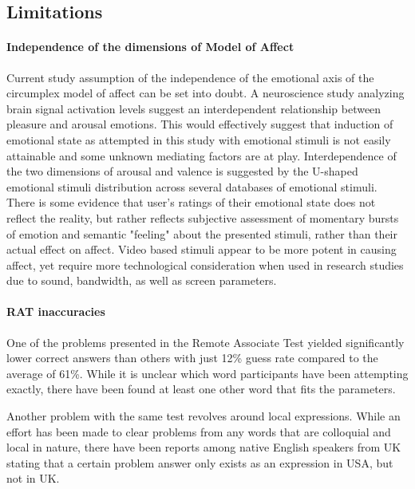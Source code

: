 	\subsection{Limitations}
	
	\paragraph{Independence of the dimensions of Model of Affect}
	
	Current study assumption of the independence of the emotional axis of the circumplex model of affect can be set into doubt. A neuroscience study \cite{Bestelmeyer2017} analyzing brain signal activation levels suggest an interdependent relationship between pleasure and arousal emotions. 
	This would effectively suggest that induction of emotional state as attempted in this study with emotional stimuli is not easily attainable and some unknown mediating factors are at play. Interdependence of the two dimensions of arousal and valence is suggested by the U-shaped emotional stimuli distribution across several databases of emotional stimuli. There is some evidence that user's ratings of their emotional state does not reflect the reality, but rather reflects subjective assessment of momentary bursts of emotion and semantic "feeling" about the presented stimuli, rather than their actual effect on affect. Video based stimuli appear to be more potent in causing affect, yet require more technological consideration when used in research studies due to sound, bandwidth, as well as screen parameters.
	
	\paragraph{RAT inaccuracies}
	
	One of the problems presented in the Remote Associate Test yielded significantly lower correct answers than others with just 12\% guess rate compared to the average of 61\%. While it is unclear which word participants have been attempting exactly, there have been found at least one other word that fits the parameters.
	
	Another problem with the same test revolves around local expressions. While an effort has been made to clear problems from any words that are colloquial and local in nature, there have been reports among native English speakers from UK stating that a certain problem answer only exists as an expression in USA, but not in UK.	%
	

